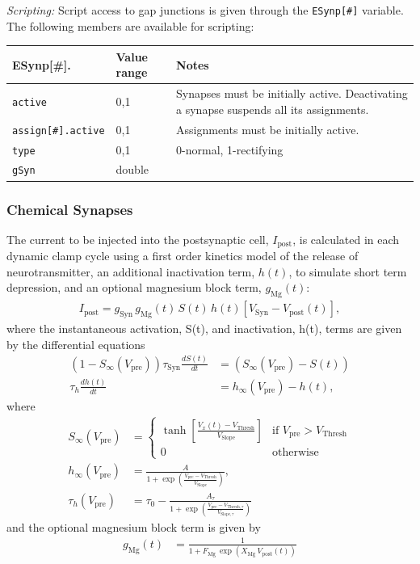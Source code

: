 \documentclass{article}
\begin{document}
\noindent
\emph{Scripting:} Script access to gap junctions is given through the \texttt{ESynp[\#]} variable.
The following members are available for scripting: \\
\begin{tabularx}{\linewidth}{|ll|X|}
	\hline
	{\bf ESynp[\#].\textvisiblespace} & {\bf Value range} & {\bf Notes} \\
	\hline
	\texttt{active} & 0,1 & Synapses must be initially active. Deactivating a synapse suspends all
	its assignments. \\
	\texttt{assign[\#].active} & 0,1 & Assignments must be initially active. \\
	\texttt{type} & 0,1 & 0-normal, 1-rectifying \\
	\texttt{gSyn} & double & \\
	\hline
\end{tabularx}


\subsubsection{Chemical Synapses}
The current to be
injected into the postsynaptic cell, $I_{\text{post}}$, is calculated
in each dynamic clamp cycle using a first order kinetics model of the
release of neurotransmitter, an additional
inactivation term, $h(t)$, to simulate short term depression, and
an optional magnesium block term, $g_{\text{Mg}}(t)$:
\begin{align}
  I_{\text{post}} = g_{\text{Syn}} \, g_{\text{Mg}}(t) \, S(t) \, h(t) [V_{\text{Syn}} -
    V_{\text{post}}(t)],
\end{align}
where the instantaneous activation, S(t), and inactivation, h(t), terms are
given by the differential equations
\begin{align}
(1-S_\infty(V_{\text{pre}})) \tau_{\text{Syn}} \frac{dS(t)}{dt} &=
(S_\infty(V_{\text{pre}}) - S(t)) \\ \tau_h \frac{dh(t)}{dt} &=
h_\infty(V_{\text{pre}}) - h(t),
\end{align}
where
\begin{align}
S_\infty(V_{\text{pre}}) &= \left\{
\begin{array}{ll}
  \tanh\left[\frac{V_x(t) - V_{\text{Thresh}}}{V_{\text{Slope}}}
    \right] & \text{if } V_{\text{pre}} > V_{\text{Thresh}} \\ 0 &
  \text{otherwise}
  \end{array}
\right. \\ 
%
h_\infty(V_{\text{pre}})&=
\frac{A}{1+\exp\left(\frac{V_{\text{pre}} -
    V_{\text{Thresh}}}{V_{\text{Slope}}}\right)}, \\  
\tau_h(V_{\text{pre}})&= \tau_{0} -
\frac{A_\tau}{1+\exp\left(\frac{V_{\text{pre}} -
    V_{\text{Thresh},\tau}}{V_{\text{Slope},\tau}} \right)}
\end{align}
and the optional magnesium block term is given by
\begin{align}
g_{\text{Mg}}(t) &= \frac{1}{1 + F_{\text{Mg}} \, \exp(X_{\text{Mg}} \, V_{\text{post}}(t))}
\end{align}
\end{document}
